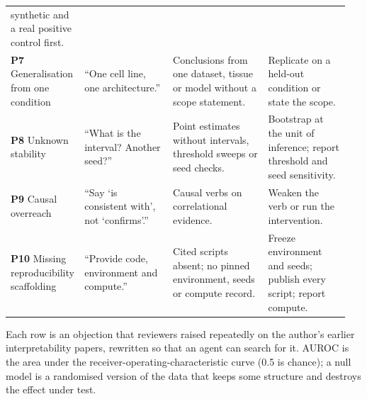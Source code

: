{\begin{longtable}{@{}p{0.17\linewidth}p{0.26\linewidth}p{0.28\linewidth}p{0.24\linewidth}@{}}
synthetic and a real positive control first. \\
\textbf{P7} Generalisation from one condition & ``One cell line, one
architecture.'' & Conclusions from one dataset, tissue or model without
a scope statement. & Replicate on a held-out condition or state the
scope. \\
\textbf{P8} Unknown stability & ``What is the interval? Another seed?'' &
Point estimates without intervals, threshold sweeps or seed checks. &
Bootstrap at the unit of inference; report threshold and seed
sensitivity. \\
\textbf{P9} Causal overreach & ``Say `is consistent with', not
`confirms'.'' & Causal verbs on correlational evidence. & Weaken the verb
or run the intervention. \\
\textbf{P10} Missing reproducibility scaffolding & ``Provide code,
environment and compute.'' & Cited scripts absent; no pinned environment,
seeds or compute record. & Freeze environment and seeds; publish every
script; report compute. \\
\end{longtable}
\begin{flushleft}
Each row is an
objection that reviewers raised repeatedly on the author's earlier
interpretability papers, rewritten so that an agent can search for it.
AUROC is the area under the receiver-operating-characteristic curve (0.5
is chance); a null model is a randomised version of the data that keeps
some structure and destroys the effect under test.
\end{flushleft}
}

